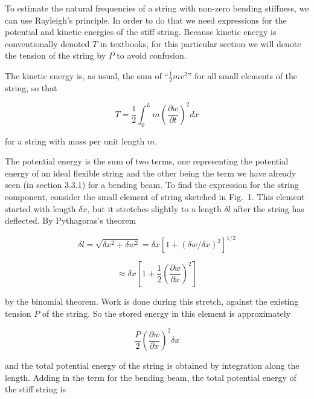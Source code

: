   To estimate the natural frequencies of a string with non-zero bending 
  stiffness, we can use Rayleigh's principle. In order to do that we need 
  expressions for the potential and kinetic energies of the stiff string. 
  Because kinetic energy is conventionally denoted $T$ in textbooks, for this 
  particular section we will denote the tension of the string by $P$ to avoid 
  confusion. 

  The kinetic energy is, as usual, the sum of ``$\frac{1}{2}m v^2$'' for all 
  small elements of the string, so that 

  \begin{equation*}T=\frac{1}{2}\int_0^L{m \left(\frac{\partial w}{\partial 
  t}\right)^2} dx \tag{1}\end{equation*} 

  \noindent{}for a string with mass per unit length $m$. 


  The potential energy is the sum of two terms, one representing the potential 
  energy of an ideal flexible string and the other being the term we have 
  already seen (in section 3.3.1) for a bending beam. To find the expression 
  for the string component, consider the small element of string sketched in 
  Fig.\ 1. This element started with length $\delta x$, but it stretches 
  slightly to a length $\delta l$ after the string has deflected. By 
  Pythagoras's theorem 

  \begin{equation*}\delta l = \sqrt{\delta x^2 + \delta w^2}=\delta x 
  [1+(\delta w / \delta x)^2]^{1/2}\end{equation*} 

  \begin{equation*}\approx \delta x \left[1+ \frac{1}{2}\left(\dfrac{\partial 
  w}{\partial x}\right)^2 \right]\tag{2}\end{equation*} 

  \noindent{}by the binomial theorem. Work is done during this stretch, against 
  the existing tension $P$ of the string. So the stored energy in this element 
  is approximately 

  \begin{equation*}\frac{P}{2}\left(\dfrac{\partial w}{\partial x}\right)^2 
  \delta x \tag{3}\end{equation*} 

  \noindent{}and the total potential energy of the string is obtained by 
  integration along the length. Adding in the term for the bending beam, the 
  total potential energy of the stiff string is 

